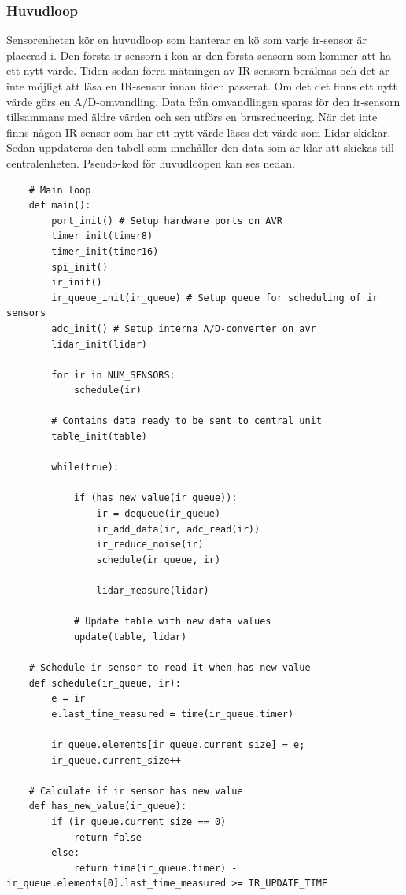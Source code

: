 \documentclass[a4paper,titlepage,12pt]{article}
\begin{document}
    \subsubsection{Huvudloop}
    Sensorenheten kör en huvudloop som hanterar en kö som varje ir-sensor är placerad 
    i. Den första ir-sensorn i kön är den första sensorn som kommer att ha ett nytt 
    värde. Tiden sedan förra mätningen av IR-sensorn beräknas och det är inte 
    möjligt att läsa en IR-sensor innan tiden passerat. Om det det finns ett nytt värde 
    görs en A/D-omvandling. Data från omvandlingen sparas för den ir-sensorn 
    tillsammans med äldre värden och sen utförs en brusreducering. När det inte finns 
    någon IR-sensor som har ett nytt värde läses det värde som Lidar skickar. Sedan 
    uppdateras den tabell som innehåller den data som är klar att skickas till 
    centralenheten. Pseudo-kod för huvudloopen kan ses nedan. 
    
    \begin{lstlisting}
    # Main loop
	def main():
		port_init() # Setup hardware ports on AVR
		timer_init(timer8)
		timer_init(timer16)
		spi_init()
    	ir_init()
		ir_queue_init(ir_queue) # Setup queue for scheduling of ir sensors
		adc_init() # Setup interna A/D-converter on avr
		lidar_init(lidar)
        
		for ir in NUM_SENSORS:
        	schedule(ir)
        
        # Contains data ready to be sent to central unit
		table_init(table)
        
		while(true):

			if (has_new_value(ir_queue)):
				ir = dequeue(ir_queue)
				ir_add_data(ir, adc_read(ir))
				ir_reduce_noise(ir)
				schedule(ir_queue, ir)
        		
				lidar_measure(lidar)
        	
        	# Update table with new data values
			update(table, lidar)
        
    # Schedule ir sensor to read it when has new value
    def schedule(ir_queue, ir):
    	e = ir
    	e.last_time_measured = time(ir_queue.timer)

    	ir_queue.elements[ir_queue.current_size] = e;
	    ir_queue.current_size++
	    
	# Calculate if ir sensor has new value
	def has_new_value(ir_queue):
    	if (ir_queue.current_size == 0) 
    		return false
    	else:
    		return time(ir_queue.timer) - ir_queue.elements[0].last_time_measured >= IR_UPDATE_TIME
	    
    \end{lstlisting}
\end{document}
